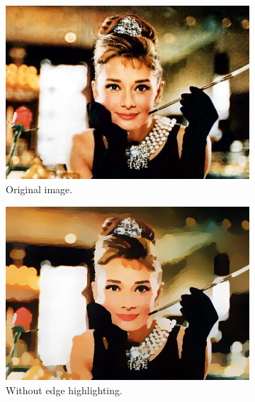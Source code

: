 \documentclass[abstracton]{scrreprt}
\begin{document}
            \begin{figure}[!ht]
                \centering
                \begin{subfigure}[b]{0.32\textwidth}
                    \includegraphics[width=\textwidth]{img/images/hepburn.png}
                    \caption{Original image.}
                \end{subfigure}
                \begin{subfigure}[b]{0.32\textwidth}
                    \includegraphics[width=\textwidth]{img/cartooning/best_pwc_hepburn.png}
                    \caption{Without edge highlighting.}
                \end{subfigure}
                \begin{subfigure}[b]{0.32\textwidth}

\end{subfigure}
\end{figure}
\end{document}
